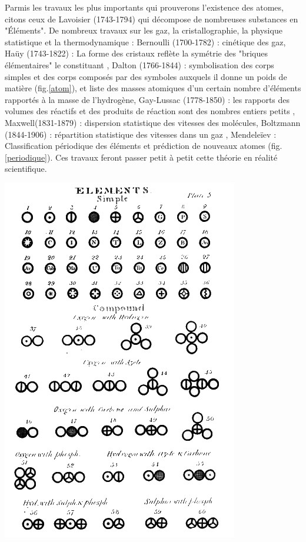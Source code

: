  Parmis les travaux les plus importants qui prouverons l'existence des atomes, citons ceux de Lavoisier (1743-1794) qui décompose de nombreuses substances en "Éléments". De nombreux travaux sur les gaz, la cristallographie, la physique statistique et la thermodynamique : Bernoulli (1700-1782) : cinétique des gaz, Haüy (1743-1822) : La forme des cristaux reflète la symétrie des "briques élémentaires" le constituant , Dalton (1766-1844) : symbolisation des corps simples et des corps composés par des symboles auxquels il donne un poids de matière (fig.\ref{atom}), et liste des masses atomiques d'un certain nombre d'éléments rapportés à la masse de l'hydrogène, Gay-Lussac (1778-1850) : les rapports des volumes des réactifs et des produits de réaction sont des nombres entiers petits , Maxwell(1831-1879) : dispersion statistique des vitesses des molécules, Boltzmann (1844-1906) : répartition statistique des vitesses dans un gaz , Mendeleïev : Classification périodique des éléments et prédiction de nouveaux atomes (fig.\ref{periodique}). Ces travaux feront passer petit à petit cette théorie en réalité scientifique. 
 
\marginpar
{
	\includegraphics[width=\marginparwidth]{SM/Dalton.png}
    	\label{atom}
}


